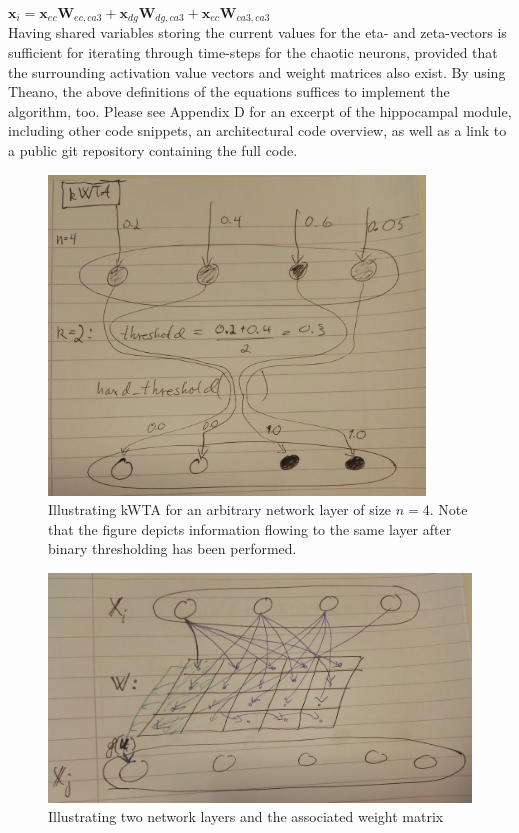 \begin{math}
    \textbf{x}_i = \textbf{x}_{ec} \textbf{W}_{ec, ca3} + \textbf{x}_{dg} \textbf{W}_{dg, ca3} + \textbf{x}_{ec} \textbf{W}_{ca3, ca3}
\end{math}
\\

Having shared variables storing the current values for the eta- and zeta-vectors is sufficient for iterating through time-steps for the chaotic neurons, provided that the surrounding activation value vectors and weight matrices also exist. By using Theano, the above definitions of the equations suffices to implement the algorithm, too. Please see Appendix D for an excerpt of the hippocampal module, including other code snippets, an architectural code overview, as well as a link to a public git repository containing the full code.

\begin{figure}
    \centering
    \includegraphics[width=10cm]{fig/kWTA_network_layout}
    \caption{Illustrating kWTA for an arbitrary network layer of size $n=4$. Note that the figure depicts information flowing to  the same layer after binary thresholding has been performed.}
    \label{fig:kWTA_illustration}
\end{figure}

\begin{figure}
    \centering
    \includegraphics[width=12cm]{fig/network_layout}
    \caption{Illustrating two network layers and the associated weight matrix}
    \label{fig:network_layout}
\end{figure}

